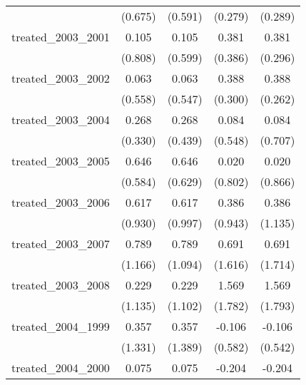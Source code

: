 {\begin{tabular}{l*{4}{c}}
            &     (0.675)         &     (0.591)         &     (0.279)         &     (0.289)         \\
[1em]
treated\_2003\_2001&       0.105         &       0.105         &       0.381         &       0.381         \\
            &     (0.808)         &     (0.599)         &     (0.386)         &     (0.296)         \\
[1em]
treated\_2003\_2002&       0.063         &       0.063         &       0.388         &       0.388         \\
            &     (0.558)         &     (0.547)         &     (0.300)         &     (0.262)         \\
[1em]
treated\_2003\_2004&       0.268         &       0.268         &       0.084         &       0.084         \\
            &     (0.330)         &     (0.439)         &     (0.548)         &     (0.707)         \\
[1em]
treated\_2003\_2005&       0.646         &       0.646         &       0.020         &       0.020         \\
            &     (0.584)         &     (0.629)         &     (0.802)         &     (0.866)         \\
[1em]
treated\_2003\_2006&       0.617         &       0.617         &       0.386         &       0.386         \\
            &     (0.930)         &     (0.997)         &     (0.943)         &     (1.135)         \\
[1em]
treated\_2003\_2007&       0.789         &       0.789         &       0.691         &       0.691         \\
            &     (1.166)         &     (1.094)         &     (1.616)         &     (1.714)         \\
[1em]
treated\_2003\_2008&       0.229         &       0.229         &       1.569         &       1.569         \\
            &     (1.135)         &     (1.102)         &     (1.782)         &     (1.793)         \\
[1em]
treated\_2004\_1999&       0.357         &       0.357         &      -0.106         &      -0.106         \\
            &     (1.331)         &     (1.389)         &     (0.582)         &     (0.542)         \\
[1em]
treated\_2004\_2000&       0.075         &       0.075         &      -0.204         &      -0.204         \\

\end{tabular}}
